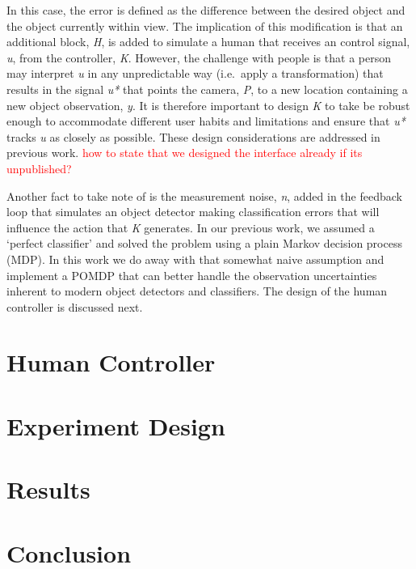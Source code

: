 \documentclass[runningheads]{llncs}
\newcommand\todo[1]{\textcolor{red}{#1}}
\begin{document}
In this case, the error is defined as the difference between the desired object and the object currently within view. 
The implication of this modification is that an additional block, \emph{H}, is added to simulate a human that receives an control signal, \emph{u}, from the controller, \emph{K}. 
However, the challenge with people is that a person may interpret \emph{u} in any unpredictable way (i.e.\ apply a transformation) that results in the signal \emph{u*} that points the camera, \emph{P}, to a new location containing a new object observation, \emph{y}.
It is therefore important to design \emph{K} to take be robust enough to accommodate different user habits and limitations and ensure that \emph{u*} tracks \emph{u} as closely as possible. 
These design considerations are addressed in previous work. \todo{how to state that we designed the interface already if its unpublished?}

Another fact to take note of is the measurement noise, \emph{n}, added in the feedback loop that simulates an object detector making classification errors that will influence the action that \emph{K} generates. 
In our previous work, we assumed a `perfect classifier' and solved the problem using a plain Markov decision process (MDP). 
In this work we do away with that somewhat naive assumption and implement a POMDP that can better handle the observation uncertainties inherent to modern object detectors and classifiers. 
The design of the human controller is discussed next. 

\section{Human Controller}



\section{Experiment Design}

\section{Results}

\section{Conclusion}



\end{document}
